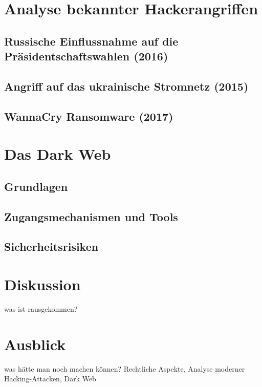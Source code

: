 \documentclass[11pt, a4paper]{article}
\begin{document}
\newpage
\section{Analyse bekannter Hackerangriffen}

\subsection{Russische Einflussnahme auf die Präsidentschaftswahlen (2016)}

\subsection{Angriff auf das ukrainische Stromnetz (2015)}

\subsection{WannaCry Ransomware (2017)}


\section{Das Dark Web}

\subsection{Grundlagen}

\subsection{Zugangsmechanismen und Tools}

\subsection{Sicherheitsrisiken}

\section{Diskussion}
was ist rausgekommen?

\section{Ausblick}
was hätte man noch machen können? Rechtliche Aspekte, Analyse moderner Hacking-Attacken, Dark Web


\appendix
\newpage
\renewcommand{\thesubsection}{\Alph{subsection}}
\pagebreak
\end{document}
